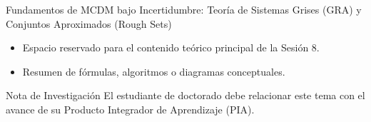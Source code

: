 \documentclass[aspectratio=169, 10pt]{beamer}
\begin{document}
\begin{frame}{Fundamentos de MCDM bajo Incertidumbre: Teoría de Sistemas Grises (GRA) y Conjuntos Aproximados (Rough Sets)}
    \begin{itemize}
        \item Espacio reservado para el contenido teórico principal de la Sesión 8.
        \item Resumen de fórmulas, algoritmos o diagramas conceptuales.
    \end{itemize}
    \begin{block}{Nota de Investigación}
        El estudiante de doctorado debe relacionar este tema con el avance de su Producto Integrador de Aprendizaje (PIA).
    \end{block}
\end{frame}
\end{document}
